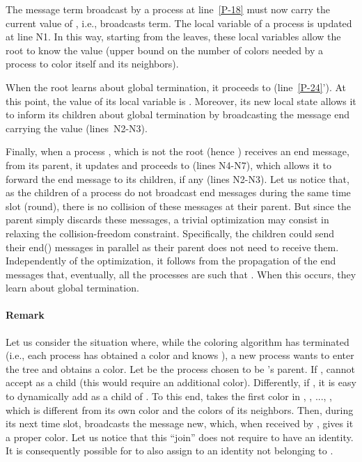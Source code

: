 \documentclass[11pt,english]{article}
\begin{document}
The message {\sc term} broadcast by a process  at
line~\ref{P-18} must now carry the current value of ,
i.e.,  broadcasts {\sc term}.  The local
variable  of a process  is updated at line N1. In this way,
starting from the leaves, these local variables allow the root to know
the value  (upper bound on the number of colors needed by
a process to color itself and its neighbors).

When the root learns about global termination, it proceeds to
 (line~\ref{P-24}'). At this point, the value of its local
variable  is . Moreover, its new local state
 allows it to inform its children about global termination by
broadcasting the message {\sc end} carrying the value 
(lines~N2-N3).

Finally, when a process , which is not the root (hence
) receives an {\sc end}  message, from
its parent, it updates  and proceeds to 
(lines N4-N7), which allows it to forward the {\sc end} message to its
children, if any (lines N2-N3).  Let us notice that, as the children
of a process  do not broadcast {\sc end} messages during the
same time slot (round), there is no collision of these messages at
their parent. But since the parent simply discards these messages, a
trivial optimization may consist in relaxing the collision-freedom
constraint. Specifically, the children could send their {\sc end}()
messages in parallel as their parent does not need to receive
them. Independently of the optimization, it follows from the
propagation of the {\sc end} messages that, eventually, all the
processes are such that . When this occurs, they learn about
global termination.

\paragraph{Remark}
Let us consider the situation where, while the coloring algorithm has 
terminated (i.e., each  process has obtained a color and knows ),  
a new process  wants to enter the tree and obtains a color. 
Let  be the process  chosen to be 's parent. 
If ,  cannot accept  as a child
(this would require an additional color).  Differently, 
if , it is easy to dynamically add  as a child of . 
To this end,  takes the first color  in , , ..., , 
which is different from its own color and the colors of its neighbors.  
Then, during its next time slot,   broadcasts the  message 
{\sc new}, which, when received by , gives it a proper 
color. Let us notice that this ``join'' does not require  to have an 
identity.  It is consequently possible for  to also assign to   an 
identity not belonging to . 
\end{document}
